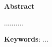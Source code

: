 \newpage
\thispagestyle{empty}
\begin{center}
{\Large \textbf{Abstract}}
\end{center}
..........

\vspace{1cm}
\textbf{Keywords}: ...


